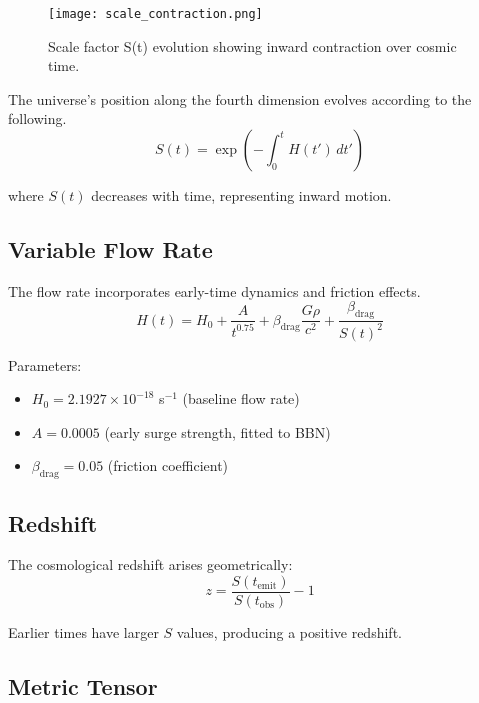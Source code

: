\documentclass[12pt,a4paper]{article}
\begin{document}
\begin{figure}[h]
\centering
\texttt{[image: scale\_contraction.png]}
\caption{Scale factor S(t) evolution showing inward contraction over cosmic time.}
\label{fig:scale}
\end{figure}

The universe's position along the fourth dimension evolves according to the following.
\begin{equation}
S(t) = \exp\left(-\int_0^t H(t') \, dt'\right)
\label{eq:scale_factor}
\end{equation}

where $S(t)$ decreases with time, representing inward motion.

\subsection{Variable Flow Rate}

The flow rate incorporates early-time dynamics and friction effects.
\begin{equation}
H(t) = H_0 + \frac{A}{t^{0.75}} + \beta_{\text{drag}} \frac{G\rho}{c^2} + \frac{\beta_{\text{drag}}}{S(t)^2}
\label{eq:hubble}
\end{equation}

Parameters:
\begin{itemize}
\item $H_0 = 2.1927 \times 10^{-18}$ s$^{-1}$ (baseline flow rate)
\item $A = 0.0005$ (early surge strength, fitted to BBN)
\item $\beta_{\text{drag}} = 0.05$ (friction coefficient)
\end{itemize}

\subsection{Redshift}

The cosmological redshift arises geometrically:
\begin{equation}
z = \frac{S(t_{\text{emit}})}{S(t_{\text{obs}})} - 1
\label{eq:redshift}
\end{equation}

Earlier times have larger $S$ values, producing a positive redshift.

\subsection{Metric Tensor}
\end{document}

